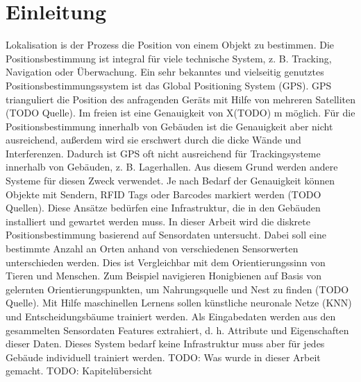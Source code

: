 \chapter{Einleitung}
Lokalisation is der Prozess die Position von einem Objekt zu bestimmen. Die Positionsbestimmung ist integral für viele technische System, z. B. Tracking, Navigation oder Überwachung.
Ein sehr bekanntes und vielseitig genutztes Positionsbestimmungssystem ist das Global Positioning System (GPS). GPS trianguliert die Position des anfragenden Geräts mit Hilfe von mehreren
Satelliten (TODO Quelle). Im freien ist eine Genauigkeit von X(TODO) m möglich. Für die Positionsbestimmung innerhalb von Gebäuden ist die Genauigkeit aber nicht ausreichend,
außerdem wird sie erschwert durch die dicke Wände und Interferenzen. Dadurch ist GPS oft nicht ausreichend für Trackingsysteme innerhalb von Gebäuden, z. B. Lagerhallen. Aus diesem Grund
werden andere Systeme für diesen Zweck verwendet. Je nach Bedarf der Genauigkeit können Objekte mit Sendern, RFID Tags oder Barcodes markiert werden (TODO Quellen). Diese Ansätze bedürfen
eine Infrastruktur, die in den Gebäuden installiert und gewartet werden muss.
\newline
\newline
In dieser Arbeit wird die diskrete Positionsbestimmung basierend auf Sensordaten untersucht. Dabei soll eine bestimmte Anzahl an Orten anhand von verschiedenen Sensorwerten unterschieden werden.
Dies ist Vergleichbar mit dem Orientierungssinn von Tieren und Menschen. Zum Beispiel navigieren Honigbienen auf Basis von gelernten Orientierungspunkten, um Nahrungsquelle und Nest zu finden (TODO Quelle).
Mit Hilfe maschinellen Lernens sollen künstliche neuronale Netze (KNN) und Entscheidungsbäume trainiert werden. Als Eingabedaten werden aus den gesammelten Sensordaten Features extrahiert,
d. h. Attribute und Eigenschaften dieser Daten. Dieses System bedarf keine Infrastruktur muss aber für jedes Gebäude individuell trainiert werden.
\newline
\newline
TODO: Was wurde in dieser Arbeit gemacht.
\newline
\newline
TODO: Kapitelübersicht

\iffalse
// Teil 1
* Leite Lokalisation ein
* Erkläre die Motivation dafür
    * Tracking
    *
* Gehe auf bestehende Systeme ein, e.g. GPS, RFID, Indoor Triangulierung
* Gehe auf deren Schwächen ein

// Teil 2
* Erkläre den untersuchten Ansatz
    * Blinden Beispiel?
    * Tier Beispiel: Honigbienen
* Gehe auf die Vorteile gegenüber den anderen Ansätze ein

// Teil 3
* Sag was in dieser Arbeit gemacht wurde

// Teil 4
* Gib eine Kapitelübersicht
\fi